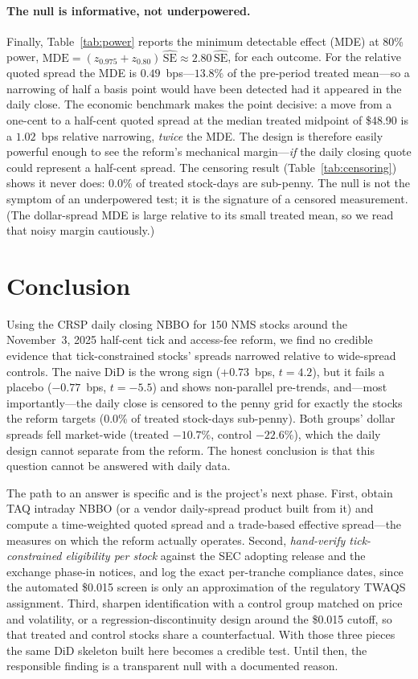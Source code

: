 \documentclass[12pt]{article}
\begin{document}
\paragraph{The null is informative, not underpowered.} Finally, Table~\ref{tab:power} reports the
minimum detectable effect (MDE) at 80\% power, $\text{MDE}=(z_{0.975}+z_{0.80})\,\widehat{\text{SE}}
\approx 2.80\,\widehat{\text{SE}}$, for each outcome. For the relative quoted spread the MDE is
$0.49$~bps---$13.8\%$ of the pre-period treated mean---so a narrowing of half a basis point would
have been detected had it appeared in the daily close. The economic benchmark makes the point
decisive: a move from a one-cent to a half-cent quoted spread at the median treated midpoint of
\$48.90 is a $1.02$~bps relative narrowing, \emph{twice} the MDE. The design is therefore easily
powerful enough to see the reform's mechanical margin---\emph{if} the daily closing quote could
represent a half-cent spread. The censoring result (Table~\ref{tab:censoring}) shows it never
does: $0.0\%$ of treated stock-days are sub-penny. The null is not the symptom of an
underpowered test; it is the signature of a censored measurement. (The dollar-spread MDE is
large relative to its small treated mean, so we read that noisy margin cautiously.)

\section{Conclusion}\label{sec:conc}
Using the CRSP daily closing NBBO for 150 NMS stocks around the November~3, 2025 half-cent
tick and access-fee reform, we find no credible evidence that tick-constrained stocks'
spreads narrowed relative to wide-spread controls. The naive DiD is the wrong sign
($+0.73$~bps, $t=4.2$), but it fails a placebo ($-0.77$~bps, $t=-5.5$) and shows
non-parallel pre-trends, and---most importantly---the daily close is censored to the penny
grid for exactly the stocks the reform targets (0.0\% of treated stock-days sub-penny).
Both groups' dollar spreads fell market-wide (treated $-10.7\%$, control $-22.6\%$), which
the daily design cannot separate from the reform. The honest conclusion is that this
question cannot be answered with daily data.

The path to an answer is specific and is the project's next phase. First, obtain TAQ
intraday NBBO (or a vendor daily-spread product built from it) and compute a time-weighted
quoted spread and a trade-based effective spread---the measures on which the reform actually
operates. Second, \emph{hand-verify tick-constrained eligibility per stock} against the SEC
adopting release and the exchange phase-in notices, and log the exact per-tranche
compliance dates, since the automated \$0.015 screen is only an approximation of the
regulatory TWAQS assignment. Third, sharpen identification with a control group matched on
price and volatility, or a regression-discontinuity design around the \$0.015 cutoff, so
that treated and control stocks share a counterfactual. With those three pieces the same DiD
skeleton built here becomes a credible test. Until then, the responsible finding is a
transparent null with a documented reason.
\end{document}
